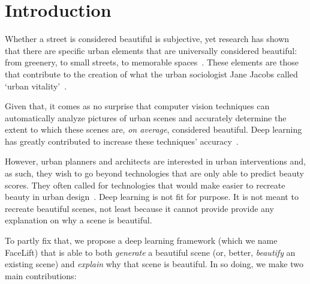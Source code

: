 \section{Introduction}


Whether a street is considered beautiful is subjective, yet research has shown that there are specific urban elements that are universally considered beautiful: from greenery, to small streets, to memorable spaces~\cite{alexander1977pattern, quercia2014aesthetic,salesses2013collaborative}. These elements are those that contribute to the creation of what the urban sociologist Jane Jacobs called `urban vitality'~\cite{jacobs1961death}. 


Given that, it comes as no surprise that computer vision techniques can automatically analyze pictures of urban scenes and accurately determine the extent to which these scenes are, \emph{on average}, considered beautiful.  Deep learning has greatly contributed to increase these techniques' accuracy~\cite{dubey2016deep}.

However, urban planners and architects are interested in urban interventions and, as such, they wish to go beyond technologies that are only able to predict beauty scores. They often called for technologies that would make easier to recreate beauty in urban design~\cite{de2008architecture}. Deep learning is not fit for purpose. It is not meant to recreate beautiful scenes, not least because it cannot provide provide any explanation on why a scene is beautiful. 

To partly fix that, we propose a deep learning framework (which we name  FaceLift) that is able to both \emph{generate} a beautiful scene (or, better, \emph{beautify} an existing scene) and \emph{explain} why that scene is beautiful.  In so doing, we make two main contributions:

